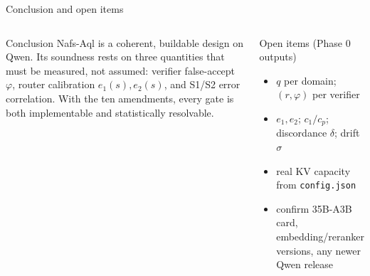 \documentclass[aspectratio=169,10pt]{beamer}
\begin{document}
\begin{frame}{Conclusion and open items}
\begin{columns}[T]
\begin{block}{Conclusion}
\small
Nafs-Aql is a coherent, buildable design on Qwen. Its soundness rests on three quantities that must be measured, not assumed: verifier false-accept $\varphi$, router calibration $e_1(s),e_2(s)$, and S1/S2 error correlation. With the ten amendments, every gate is both implementable and statistically resolvable.
\end{block}
\begin{alertblock}{Open items (Phase 0 outputs)}
\small
\begin{itemize}\setlength\itemsep{1pt}
\item $q$ per domain; $(r,\varphi)$ per verifier
\item $e_1,e_2$; $c_1/c_p$; discordance $\delta$; drift $\sigma$
\item real KV capacity from \texttt{config.json}
\item confirm 35B-A3B card, embedding/reranker versions, any newer Qwen release
\end{itemize}
\end{alertblock}
\end{columns}
\end{frame}
\end{document}
